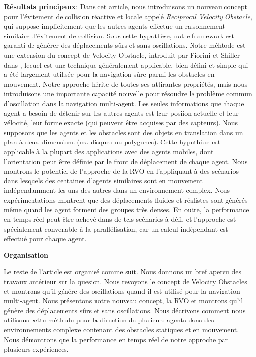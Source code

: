 \documentclass[11pt]{article}
\begin{document}
\textbf{Résultats principaux}: Dans cet article, nous introduisons un nouveau concept pour l'évitement de collision réactive et locale appelé \textit{Reciprocal Velocity Obstacle}, qui suppose implicitement que les autres agents effectue un raisonnement similaire d'évitement de collision. Sous cette hypothèse, notre framework est garanti de générer des déplacements sûrs et sans oscillations.
\newline
Notre méhtode est une extension du concept de Velocity Obstacle, introduit par Fiorini et Shiller dans \cite{fiorini-01}, lequel est une technique généralement applicable, bien défini et simple qui a été largement utilisée pour la navigation sûre parmi les obstacles en mouvement. Notre approche hérite de toutes ses attirantes propriétés, mais nous introduisons une importante capacité  nouvelle pour résoudre le problème commun d'oscillation dans la navigation multi-agent.
\newline
Les seules informations que chaque agent a besoin de détenir sur les autres agents est leur posiion actuelle et leur vélocité, leur forme exacte (qui peuvent être acquises par des capteurs). Nous supposons que les agents et les obstacles sont des objets en translation dans un plan à deux dimensions (ex. disques ou polygones). Cette hypothèse est applicable à la plupart des applications avec des agents mobiles, dont l'orientation peut être définie par le front de déplacement de chaque agent.
\newline
Nous montrons le potentiel de l'approche de la RVO en l'appliquant à des scénarios dans lesquels des centaines d'agents similaires sont en mouvement indépendamment les uns des autres dans un environnement complex. Nous expérimentations montrent que des déplacements fluides et réalistes sont générés même quand les agent forment des groupes très denses. En outre, la performance en temps réel peut être achevé dans de tels scénarios à défi, et l'approche est spécialement convenable à la parallélisation, car un calcul indépendant est effectué pour chaque agent.

\textbf{Organisation} 

Le reste de l'article est organisé comme suit. Nous donnons un bref apercu des travaux antérieur sur la quesion. Nous revoyons le concept de Velocity Obstacles et montrons qu'il génére des oscillations quand il est utilisé pour la navigation multi-agent. Nous présentons notre nouveau concept, la RVO et montrons qu'il génère des déplacements sûrs et sans oscillations. Nous décrivons comment nous utilisons cette méthode pour la direction de plusieurs agents dans des environnements complexe contenant des obstacles statiques et en mouvement. Nous démontrons que la performance en temps réel de notre approche par plusieurs expériences.
\end{document}
